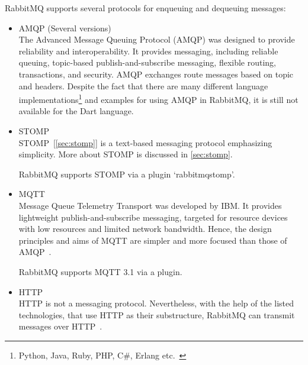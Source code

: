 RabbitMQ supports several protocols for enqueuing and dequeuing messages:
\begin{itemize}
  \item AMQP (Several versions)\\
  The Advanced Message Queuing Protocol (AMQP) was designed to provide reliability and interoperability. It provides messaging, including reliable queuing, topic-based publish-and-subscribe messaging, flexible routing, transactions, and security. AMQP exchanges route messages based on topic and headers\cite{andyPiperVmware}.
  Despite the fact that there are many different language implementations\footnote{Python, Java, Ruby, PHP, C\#, Erlang etc.~\cite{rabbitmqGetstarted}} and examples for using AMQP in RabbitMQ, it is still not available for the Dart language.

  \item STOMP\\
  STOMP~[\autoref{sec:stomp}] is a text-based messaging protocol emphasizing simplicity. More about STOMP is discussed in \autoref{sec:stomp}.

  RabbitMQ supports STOMP via a plugin \textendash{} ‘rabbitmq\textunderscore{}stomp’.

  \item MQTT\\
  Message Queue Telemetry Transport was developed by IBM. It provides lightweight publish-and-subscribe messaging, targeted for resource devices with low resources and limited network bandwidth. Hence, the design principles and aims of MQTT are simpler and more focused than those of AMQP~\cite{andyPiperVmware}.

  RabbitMQ supports MQTT 3.1 via a plugin.
  \item HTTP\\
  HTTP is not a messaging protocol. Nevertheless, with the help of the listed technologies, that use HTTP as their substructure, RabbitMQ can transmit messages over HTTP~\cite{rabbitmqProtocols}.

\end{itemize}

